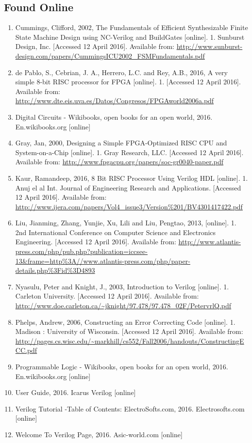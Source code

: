 \subsection{Found Online}

\begin{enumerate}
  \item Cummings, Clifford, 2002, The Fundamentals of Efficient Synthesizable Finite State Machine Design using NC-Verilog and BuildGates [online]. 1. Sunburst Design, Inc. [Accessed 12  April  2016]. Available from: \url{http://www.sunburst-design.com/papers/CummingsICU2002\_FSMFundamentals.pdf}
  \item de Pablo, S., Cebrian, J. A., Herrero, L.C. and Rey, A.B., 2016, A very simple 8-bit RISC processor for FPGA [online]. 1. [Accessed 12  April  2016]. Available from: \url{http://www.dte.eis.uva.es/Datos/Congresos/FPGAworld2006a.pdf}
  \item Digital Circuits - Wikibooks, open books for an open world, 2016. En.wikibooks.org [online]
  \item Gray, Jan, 2000, Designing a Simple FPGA-Optimized RISC CPU and System-on-a-Chip [online]. 1. Gray Research, LLC. [Accessed 12  April  2016]. Available from: \url{http://www.fpgacpu.org/papers/soc-gr0040-paper.pdf}
  \item Kaur, Ramandeep, 2016, 8 Bit RISC Processor Using Verilog HDL [online]. 1. Anuj el al Int. Journal of Engineering Research and Applications. [Accessed 12  April  2016]. Available from: \url{http://www.ijera.com/papers/Vol4\_issue3/Version\%201/BV4301417422.pdf}
  \item Liu, Jianming, Zhang, Yunjie, Xu, Lili and Liu, Pengtao, 2013, [online]. 1. 2nd International Conference on Computer Science and Electronics Engineering. [Accessed 12  April  2016]. Available from: \url{http://www.atlantis-press.com/php/pub.php?publication=iccsee-13\&frame=http\%3A//www.atlantis-press.com/php/paper-details.php\%3Fid\%3D4893}
  \item Nyasulu, Peter and Knight, J., 2003, Introduction to Verilog [online]. 1. Carleton University. [Accessed 12  April  2016]. Available from: \url{http://www.doe.carleton.ca/~jknight/97.478/97.478\_02F/PetervrlQ.pdf}
  \item Phelps, Andrew, 2006, Constructing an Error Correcting Code [online]. 1. Madison : University of Wisconsin. [Accessed 12  April  2016]. Available from: \url{http://pages.cs.wisc.edu/~markhill/cs552/Fall2006/handouts/ConstructingECC.pdf}
  \item Programmable Logic - Wikibooks, open books for an open world, 2016. En.wikibooks.org [online]
  \item User Guide, 2016. Icarus Verilog [online]
  \item Verilog Tutorial -Table of Contents: ElectroSofts.com, 2016. Electrosofts.com [online]
  \item Welcome To Verilog Page, 2016. Asic-world.com [online]
\end{enumerate}


